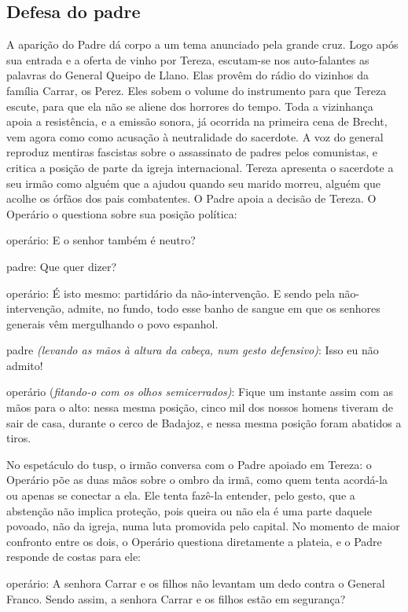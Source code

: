 \subsection{Defesa do padre}

A aparição do Padre dá corpo a um tema anunciado pela grande cruz. Logo
após sua entrada e a oferta de vinho por Tereza, escutam-se nos
auto-falantes as palavras do General Queipo de Llano. Elas provêm do
rádio do vizinhos da família Carrar, os Perez. Eles sobem o volume do
instrumento para que Tereza escute, para que ela não se aliene dos
horrores do tempo. Toda a vizinhança apoia a resistência, e a emissão
sonora, já ocorrida na primeira cena de Brecht, vem agora como como
acusação à neutralidade do sacerdote. A voz do general reproduz mentiras
fascistas sobre o assassinato de padres pelos comunistas, e critica a
posição de parte da igreja internacional. Tereza apresenta o sacerdote a
seu irmão como alguém que a ajudou quando seu marido morreu, alguém que
acolhe os órfãos dos pais combatentes. O Padre apoia a decisão de
Tereza. O Operário o questiona sobre sua posição política:

{\sc operário}: E o senhor também é neutro?

{\sc padre}: Que quer dizer?

{\sc operário}: É isto mesmo: partidário da não-intervenção. E sendo pela
não-intervenção, admite, no fundo, todo esse banho de sangue em que os
senhores generais vêm mergulhando o povo espanhol.

{\sc padre} {\it (levando as mãos à altura da cabeça, num gesto defensivo)}:
Isso eu não admito!

{\sc operário} ({\it fitando-o com os olhos semicerrados)}: Fique um instante
assim com as mãos para o alto: nessa mesma posição, cinco mil dos nossos
homens tiveram de sair de casa, durante o cerco de Badajoz, e nessa
mesma posição foram abatidos a tiros.

No espetáculo do {\sc tusp}, o irmão conversa com o Padre apoiado em Tereza: o
Operário põe as duas mãos sobre o ombro da irmã, como quem tenta
acordá-la ou apenas se conectar a ela. Ele tenta fazê-la entender, pelo
gesto, que a abstenção não implica proteção, pois queira ou não ela é
uma parte daquele povoado, não da igreja, numa luta promovida pelo
capital. No momento de maior confronto entre os dois, o Operário
questiona diretamente a plateia, e o Padre responde de costas para ele:

{\sc operário}: A senhora Carrar e os filhos não levantam um dedo contra o
General Franco. Sendo assim, a senhora Carrar e os filhos estão em
segurança?

